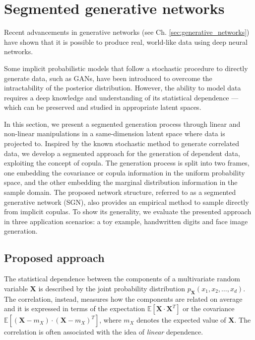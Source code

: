 \section{Segmented generative networks}
\label{sec:sgn}
Recent advancements in generative networks (see Ch. \ref{sec:generative_networks}) have shown that it is possible to produce real, world-like data using deep neural networks. 

Some implicit probabilistic models that follow a stochastic procedure to directly generate data, such as GANs, have been introduced to overcome the intractability of the posterior distribution. However, the ability to model data requires a deep knowledge and understanding of its statistical dependence — which can be preserved and studied in appropriate latent spaces. 

In this section, we present a segmented generation process through linear and non-linear manipulations in a same-dimension latent space where data is projected to. Inspired by the known stochastic method to generate correlated data, we develop a segmented approach for the generation of dependent data, exploiting the concept of copula. The generation process is split into two frames, one embedding the covariance or copula information in the uniform probability space, and
the other embedding the marginal distribution information in the
sample domain. 
The proposed network structure, referred to as a
segmented generative network (SGN), also provides an empirical method to sample directly from implicit copulas.
To show its generality, we evaluate the presented approach in three application scenarios: a toy example, handwritten digits and face image generation.

\subsection{Proposed approach}
\label{subsec:sgn_proposal_approach}
The statistical dependence between the components of a multivariate random variable $\mathbf{X}$ is described by the joint probability distribution $p_{\mathbf{X}}(x_1, x_2, \dots, x_d)$. The correlation, instead, measures how the components are related on average and it is expressed in terms of the expectation $\mathbb{E}[\mathbf{X}\cdot \mathbf{X}^T]$ or the covariance $\mathbb{E}[(\mathbf{X}-m_X)\cdot (\mathbf{X}-m_X)^T]$, where $m_X$ denotes the expected value of $\mathbf{X}$. The correlation is often associated with the idea of \textit{linear} dependence.

